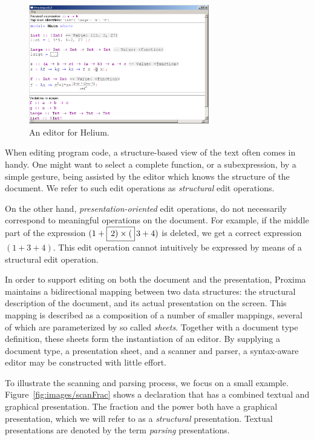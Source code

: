 \documentclass[12pt]{article}
\begin{document}
\begin{figure}[ht]
\centering
\includegraphics[width=0.7\textwidth]{images/HeliumEditor}
\caption{An editor for Helium.}
\label{fig:heliumEditor}
\end{figure}


When editing program code, a structure-based view of the text often comes in handy. One might want to select a complete  function, or a subexpression, by a simple gesture, being assisted by the editor which knows the structure of the document. We refer to such edit operations as {\em structural} edit operations.

On the other hand, {\em presentation-oriented} edit operations, do not necessarily correspond to meaningful operations on the document. For example, if the middle part of the expression $(1+\framebox{$\,2) \times ($}\,3+4)$ is deleted, we get a correct expression $(1+3+4)$. This edit operation cannot intuitively be expressed by means of a structural edit operation.


In order to support editing on both the document and the presentation, Proxima maintains a bidirectional mapping between two data structures: the structural description of the document, and its actual presentation on the screen. This mapping is described as a composition of a number of smaller mappings, several of which are parameterized by so called {\em sheets}. Together with a document type definition, these sheets form the instantiation of an editor. By supplying a document type, a presentation sheet, and a scanner and parser, a syntax-aware editor may be constructed with little effort.



To illustrate the scanning and parsing process, we focus on a small example. Figure~\ref{fig:images/scanFrac} shows a declaration that has a combined textual and graphical presentation. The fraction and the power both have a graphical presentation, which we will refer to as a {\em structural} presentation. Textual presentations are denoted by the term {\em parsing} presentations. 
\end{document}
